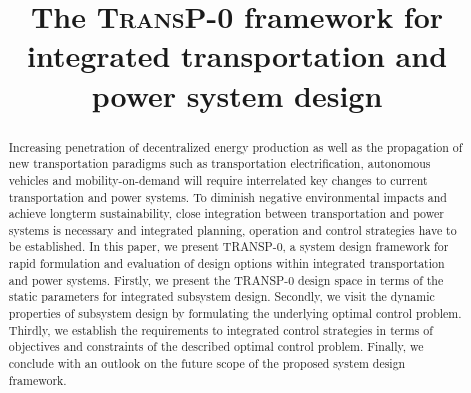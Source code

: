 \title{The \textsc{TransP-0} framework for integrated transportation and power system design}

\author{
	\and
}

\maketitle

\begin{abstract}
	Increasing penetration of decentralized energy production as well as the propagation of new transportation paradigms such as transportation electrification, autonomous vehicles and mobility-on-demand will require interrelated key changes to current transportation and power systems.
	To diminish negative environmental impacts and achieve longterm sustainability, close integration between transportation and power systems is necessary and integrated planning, operation and control strategies have to be established. In this paper, we present TRANSP-0, a system design framework for rapid 
	formulation and evaluation of design options within integrated transportation and power systems. Firstly, we present the TRANSP-0 design space in terms of the static parameters for integrated subsystem design. Secondly, we visit the dynamic properties of subsystem design by formulating the underlying optimal control problem. Thirdly, we establish the requirements to integrated control strategies in terms of objectives and constraints of the described optimal control problem. Finally, we conclude with an outlook on the future scope of the proposed system design framework.
	
\end{abstract}
